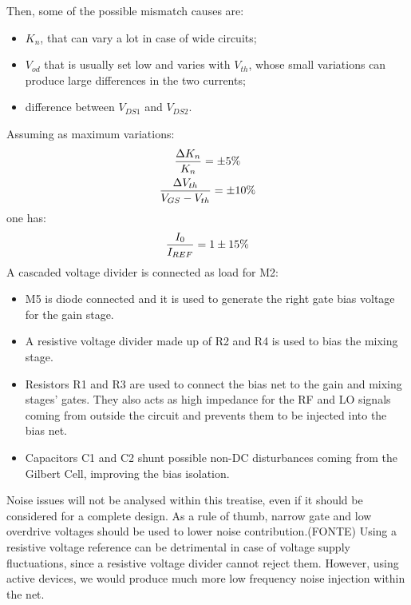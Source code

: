 Then, some of the possible mismatch causes are:
\begin{itemize}
	\item $K_n$, that can vary a lot in case of wide circuits;
	\item $V_{od}$ that is usually set low and varies with $V_{th}$, whose small variations can produce large differences in the two currents;
	\item difference between $V_{DS1}$ and $V_{DS2}$.
\end{itemize}
Assuming as maximum variations:
\begin{gather}
\frac{\Delta K_n}{K_n} = \pm 5 \% \notag \\
\frac{\Delta V_{th}}{V_{GS}-V_{th}} = \pm 10 \% \notag
\end{gather}
one has:
\begin{equation}
\frac{I_0}{I_{REF}} = 1 \pm 15 \% \notag
\end{equation}
A cascaded voltage divider is connected as load for M2: 
\begin{itemize}
	\item M5 is diode connected and it is used to generate the right gate bias voltage for the gain stage.
	\item A resistive voltage divider made up of R2 and R4 is used to bias the mixing stage.
	\item Resistors R1 and R3 are used to connect the bias net to the gain and mixing stages' gates. They also acts as high impedance for the RF and LO signals coming from outside the circuit and prevents them to be injected into the bias net.
	\item Capacitors C1 and C2 shunt possible non-DC disturbances coming from the Gilbert Cell, improving the bias isolation.
\end{itemize}

Noise issues will not be analysed within this treatise, even if it should be considered for a complete design. As a rule of thumb, narrow gate and low overdrive voltages should be used to lower noise contribution.(FONTE) 
Using a resistive voltage reference can be detrimental in case of voltage supply fluctuations, since a resistive voltage divider cannot reject them. However, using active devices, we would produce much more low frequency noise injection within the net.


